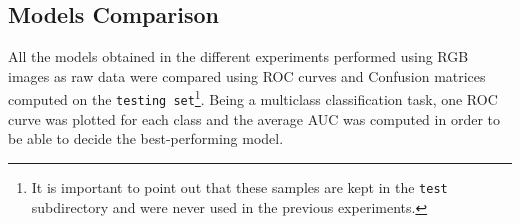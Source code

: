 \documentclass[11pt,a4paper]{article}
\begin{document}
\subsection{Models Comparison}
All the models obtained in the different experiments performed using RGB images as raw data were compared using ROC curves and Confusion matrices computed on the \texttt{testing set}\footnote{It is important to point out that these samples are kept in the \texttt{test} subdirectory and were never used in the previous experiments.}. Being a multiclass classification task, one ROC curve was plotted for each class and the average AUC was computed in order to be able to decide the best-performing model.
\begin{figure}[H]
    \centering
\end{figure}
\end{document}

